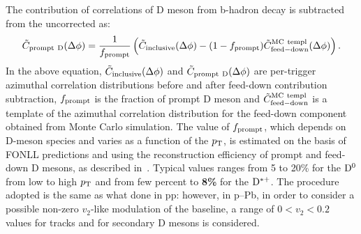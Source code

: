 \begin{comment}
\begin{figure}
\centering
 \caption{Top left: azimuthal correlation distribution between D meson from b-hadron decay and charged particles obtained from a Monte Carlo simulation
based on Pythia (Perugia-0 tune) fitted with a 2+1 Gaussian + constant function. The violet histogram is the template obtained by scaling the baseline
in order to match that measured in data. Top right: data correlation distributions obtained after the subtraction of the feed-down component, using 3 different values of $f_{\rm prompt}$ resulting
from the variation of the charm and beauty quark masses and factorization and renormalization scales employed in the FONLL calculation. Bottom: ratios between the azimuthal
distribution obtained with the maximum and minimum $f_{\rm prompt}$ values and that obtained with the central $f_{\rm prompt}$ value.}
 \label{fig:feeddownDescription}
\end{figure}
\end{comment}
%
%
The contribution of correlations of D meson from b-hadron decay is subtracted from the uncorrected as:
\begin{equation}
\tilde{C}_{\rm prompt~D}(\Delta\phi)=\frac{1}{f_{\rm prompt}}\left(\tilde{C}_{\rm inclusive}(\Delta\phi)-(1-f_{\rm prompt})\tilde{C}_{\rm feed-down}^{\rm MC~templ}(\Delta\phi) \right).
\label{eqFeedDown}
\end{equation}
In the above equation, $\tilde{C}_{\rm inclusive}(\Delta\phi)$ and $\tilde{C}_{\rm prompt~D}(\Delta\phi)$ are per-trigger azimuthal correlation distributions before and after
feed-down contribution subtraction, $f_{\rm prompt}$ is the fraction of prompt D meson and $\tilde{C}_{\rm feed-down}^{\rm MC~templ}$ is a template
of the azimuthal correlation distribution for the feed-down component obtained from Monte Carlo simulation. The value of $f_{\rm prompt}$, which depends on D-meson species and varies as a function of the $p_{\rm T}$, is estimated on the basis of FONLL predictions
and using the reconstruction efficiency of prompt and feed-down D mesons, as described in~\cite{ALICEDmespp7Tev}. Typical values ranges from 5 to 20\% for the
${\rm D^0}$ from low to high $p_{\rm T}$ and from few percent to {\bf 8\%} for the ${\rm D^{*+}}$. The procedure adopted is the same as what done in pp: however, in p--Pb, in order to consider a possible non-zero $v_{2}$-like modulation of the baseline, a range of $0<v_{2}<0.2$ values for tracks and for secondary D mesons is considered. %
